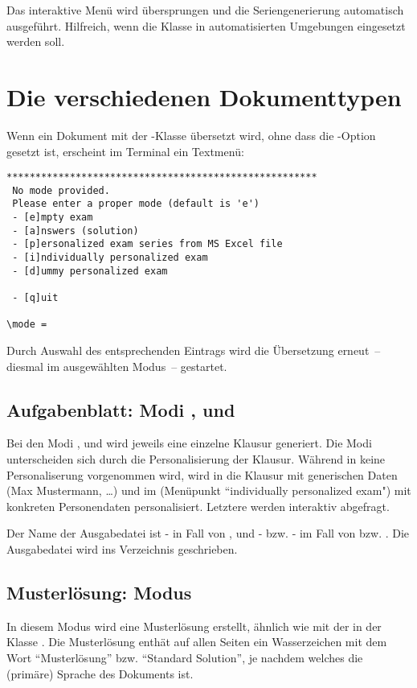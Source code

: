 \documentclass[
load=osgexam,
babel=ngerman
]{skdoc}
\begin{document}
\noindent Das interaktive Menü wird übersprungen und die Seriengenerierung automatisch ausgeführt. Hilfreich, wenn die Klasse in automatisierten Umgebungen eingesetzt werden soll. 
\medskip


\section{Die verschiedenen Dokumenttypen}
Wenn ein Dokument mit der \thepkg-Klasse übersetzt wird, ohne dass die -Option gesetzt ist, erscheint
im Terminal ein Textmenü:
\begin{verbatim}
******************************************************
 No mode provided.
 Please enter a proper mode (default is 'e') 
 - [e]mpty exam
 - [a]nswers (solution)
 - [p]ersonalized exam series from MS Excel file
 - [i]ndividually personalized exam
 - [d]ummy personalized exam

 - [q]uit 

\mode =
\end{verbatim}

Durch Auswahl des entsprechenden Eintrags wird die Übersetzung erneut~-- diesmal im ausgewählten Modus~-- gestartet.

\subsection{Aufgabenblatt: Modi ,  und }
Bei den Modi  ,  und  wird jeweils eine einzelne Klausur generiert.
Die Modi unterscheiden sich durch die Personalisierung der Klausur. Während in  keine Personaliserung
vorgenommen wird, wird in  die Klausur mit generischen Daten (Max Mustermann, \ldots) und im 
(Menüpunkt ``individually personalized exam") mit konkreten Personendaten personalisiert. Letztere werden interaktiv
abgefragt.

Der Name der Ausgabedatei ist - in Fall von , und
- bzw. - im Fall von  bzw. . Die
Ausgabedatei wird ins Verzeichnis  geschrieben.

\subsection{Musterlösung: Modus }
In diesem Modus wird eine Musterlösung erstellt, ähnlich wie mit der  in der Klasse .
Die Musterlösung enthät auf allen Seiten ein Wasserzeichen mit dem Wort ``Musterlösung'' bzw. ``Standard Solution'', je
nachdem welches die (primäre) Sprache des Dokuments ist.
\end{document}
